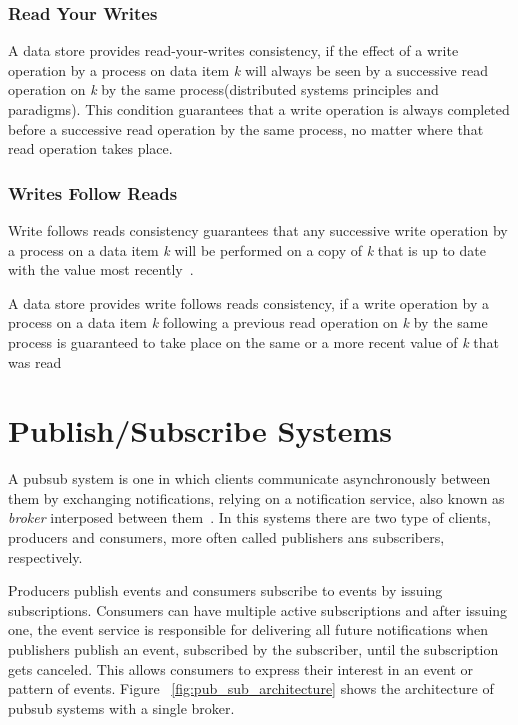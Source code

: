 \subsubsection{Read Your Writes}
\label{sec:read_your_writes}

A data store provides read-your-writes consistency, if the effect of a write operation by a process on data item \textit{k} will always be seen by a successive read operation on \textit{k} by the same process(distributed systems principles and paradigms). This condition guarantees that a write operation is always completed before a successive read operation by the same process, no matter where that read operation takes place. 

\subsubsection{Writes Follow Reads}
\label{sec:writes_follow_reads}

Write follows reads consistency guarantees that any successive write operation by a process on a data item \textit{k} will be performed on a copy of \textit{k} that is up to date with the value most recently~\cite{distributed-systems-principles-paradigms}.

A data store provides write follows reads consistency, if a write operation by a process on a data item \textit{k} following a previous read operation on \textit{k} by the same process is guaranteed to take place on the same or a more recent value of \textit{k} that was read

\section{Publish/Subscribe Systems}
\label{sec:pub_sub}

A \gls{pubsub} system is one in which clients communicate asynchronously between them by exchanging notifications, relying on a notification service, also known as \textit{broker} interposed between them~\cite{large-content-based-pubsub-systems}. In this systems there are two type of clients, producers and consumers, more often called publishers ans subscribers, respectively.

Producers publish events and consumers subscribe to events by issuing subscriptions. Consumers can have multiple active subscriptions and after issuing one, the event service is responsible for delivering all future notifications when publishers publish an event, subscribed by the subscriber, until the subscription gets canceled. This allows consumers to express their interest in an event or pattern of events. Figure ~\ref{fig:pub_sub_architecture} shows the architecture of \gls{pubsub} systems with a single broker. 

